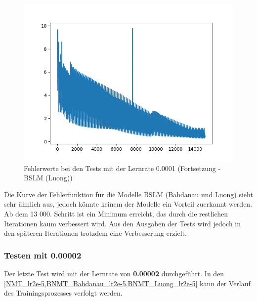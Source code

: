 \begin{figure}
	\centering
		\includegraphics[scale=0.55]{images/bslm_luong_100EP_1e-4.png}
		\caption{ Fehlerwerte bei den Tests mit der Lernrate 0.0001 (Fortsetzung - BSLM (Luong))}
		\label{BNMT_Luong_lr1e-4}

\end{figure}


Die Kurve der Fehlerfunktion für die Modelle BSLM (Bahdanau und Luong) sieht sehr ähnlich aus, jedoch könnte keinem der Modelle ein Vorteil zuerkannt werden. Ab dem 13 000. Schritt ist ein Minimum erreicht, das durch die restlichen Iterationen kaum verbessert wird. Aus den Ausgaben der Tests wird jedoch in den späteren Iterationen trotzdem eine Verbesserung erzielt.
 

\subsubsection{Testen mit 0.00002}
Der letzte Test wird mit der Lernrate von \textbf{0.00002} durchgeführt. In den 
\cref{NMT_lr2e-5,BNMT_Bahdanau_lr2e-5,BNMT_Luong_lr2e-5} kann der Verlauf des Trainingsprozesses verfolgt werden. 



